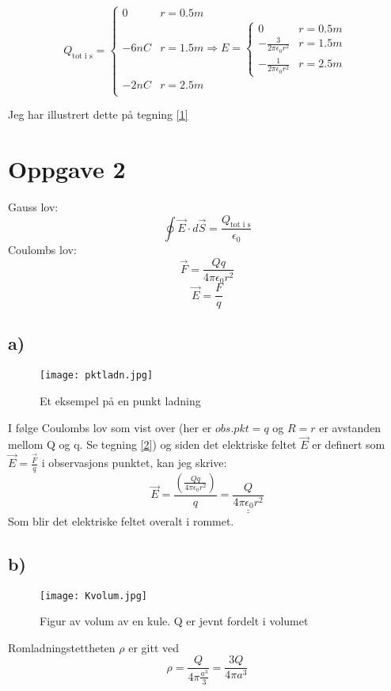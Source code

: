 \documentclass[a4paper,12pt,norsk]{article}
\begin{document}
\[ Q_{\text{tot i s}} = \begin{cases}
0 & r = 0.5 m\\
 -6nC &  r = 1.5m \Rightarrow E = \begin{cases}
 0 & r = 0.5 m\\-\frac{3}{2\pi \epsilon_0r^2} &  r = 1.5m\\-\frac{1}{2\pi \epsilon_0r^2} & r= 2.5m
 \end{cases}\\
-2nC & r= 2.5m\\
\end{cases}\]

Jeg har illustrert dette på tegning \vref{1}

\section{Oppgave 2}
Gauss lov:
$$\oint \vec{E} \cdot d\vec{S} = \frac{Q_{\text{tot i s}}}{\epsilon_0}$$
Coulombs lov:
$$\vec{F} = \frac{Qq}{4\pi \epsilon_0 r^2}$$
$$\vec{E} = \frac{F}{q}$$

\subsection{a)}
\begin{figure}[h!]
\texttt{[image: pktladn.jpg]} 
\caption{Et eksempel på en punkt ladning}
\label{2}
\end{figure} 

I følge Coulombs lov som vist over (her er $obs.pkt = q$ og $R = r$ er avstanden mellom Q og q. Se tegning \vref{2}) og siden det elektriske feltet $\vec{E}$ er definert som $\vec{E} = \frac{\vec{F}}{q}$ i observasjons punktet, kan jeg skrive: 
$$\vec{E} = \frac{\left(\frac{Qq}{4\pi \epsilon_0 r^2}\right)}{q} = \underline{\underline{\frac{Q}{4\pi \epsilon_0 r^2}}}$$
Som blir det elektriske feltet overalt i rommet.

\subsection{b)}
\begin{figure}[h!]
\texttt{[image: Kvolum.jpg]} 
\caption{Figur av volum av en kule. Q er jevnt fordelt i volumet}
\label{3}
\end{figure} 

Romladningstettheten $\rho$ er gitt ved $$\rho = \frac{{Q}}{4\pi \frac{a^3}{3}} = \frac{{3Q}}{4\pi a^3} $$
\end{document}
